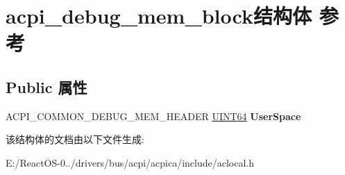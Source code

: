 \hypertarget{structacpi__debug__mem__block}{}\section{acpi\+\_\+debug\+\_\+mem\+\_\+block结构体 参考}
\label{structacpi__debug__mem__block}
\subsection*{Public 属性}
\begin{DoxyCompactItemize}
\item 
\mbox{\label{structacpi__debug__mem__block_a2a6c12098bf8327e3b90b52337caa7bd}} 
A\+C\+P\+I\+\_\+\+C\+O\+M\+M\+O\+N\+\_\+\+D\+E\+B\+U\+G\+\_\+\+M\+E\+M\+\_\+\+H\+E\+A\+D\+ER \hyperlink{_processor_bind_8h_a57be03562867144161c1bfee95ca8f7c}{U\+I\+N\+T64} {\bfseries User\+Space}
\end{DoxyCompactItemize}


该结构体的文档由以下文件生成\+:\begin{DoxyCompactItemize}
\item 
E\+:/\+React\+O\+S-\/0../drivers/bus/acpi/acpica/include/aclocal.\+h\end{DoxyCompactItemize}
